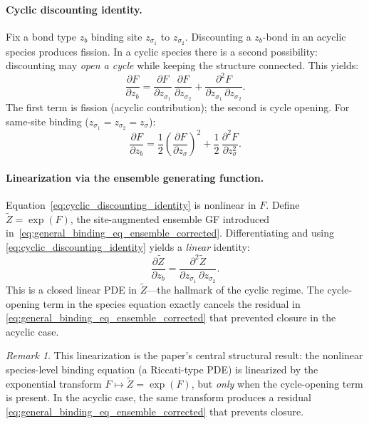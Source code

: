 \documentclass[11pt]{amsart}
\newcommand{\GFspecies}{F}
\newcommand{\GFensemble}{Z}
\newcommand{\PDeriv}[2]{\frac{\partial #1}{\partial #2}}
\theoremstyle{definition}
\theoremstyle{plain}
\theoremstyle{remark}
\newtheorem*{remark}{Remark}
\begin{document}
\paragraph{Cyclic discounting identity.}
Fix a bond type $z_b$ binding site $z_{\sigma_1}$ to $z_{\sigma_2}$.
Discounting a $z_b$-bond in an acyclic species produces fission.
In a cyclic species there is a second possibility: discounting may \emph{open a cycle} while keeping the structure connected.
This yields:
\begin{equation}\label{eq:cyclic_discounting_identity}
\PDeriv{\GFspecies}{z_b}
=
\PDeriv{\GFspecies}{z_{\sigma_1}}\,\PDeriv{\GFspecies}{z_{\sigma_2}}
+
\frac{\partial^2\GFspecies}{\partial z_{\sigma_1}\,\partial z_{\sigma_2}}.
\end{equation}
The first term is fission (acyclic contribution); the second is cycle opening.
For same-site binding ($z_{\sigma_1}=z_{\sigma_2}=z_\sigma$):
\begin{equation}\label{eq:cyclic_discounting_samesite}
\PDeriv{\GFspecies}{z_b}
=
\frac{1}{2}\left(\PDeriv{\GFspecies}{z_\sigma}\right)^{\!2}
+
\frac{1}{2}\,\frac{\partial^2\GFspecies}{\partial z_\sigma^2}.
\end{equation}

\paragraph{Linearization via the ensemble generating function.}
Equation~\eqref{eq:cyclic_discounting_identity} is nonlinear in $\GFspecies$.
Define $\widetilde{\GFensemble} = \exp(\GFspecies)$, the site-augmented ensemble GF introduced in~\eqref{eq:general_binding_eq_ensemble_corrected}.
Differentiating and using \eqref{eq:cyclic_discounting_identity} yields a \emph{linear} identity:
\begin{equation}\label{eq:linearized_cycle_identity}
\PDeriv{\widetilde{\GFensemble}}{z_b}
=
\frac{\partial^2\widetilde{\GFensemble}}{\partial z_{\sigma_1}\,\partial z_{\sigma_2}}.
\end{equation}
This is a closed linear PDE in $\widetilde{\GFensemble}$---the hallmark of the cyclic regime.
The cycle-opening term in the species equation exactly cancels the residual in \eqref{eq:general_binding_eq_ensemble_corrected} that prevented closure in the acyclic case.

\begin{remark}
This linearization is the paper's central structural result: the nonlinear species-level binding equation (a Riccati-type PDE) is linearized by the exponential transform $\GFspecies\mapsto\widetilde{\GFensemble} = \exp(\GFspecies)$, but \emph{only} when the cycle-opening term is present.
In the acyclic case, the same transform produces a residual \eqref{eq:general_binding_eq_ensemble_corrected} that prevents closure.
\end{remark}
\end{document}
